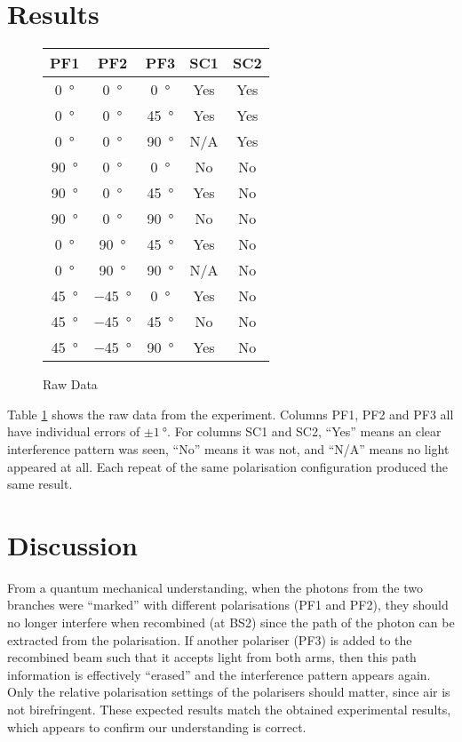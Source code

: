 \documentclass[a4paper]{scrartcl}
\begin{document}
\section{Results}
\begin{figure}
    \centering
    \begin{tabular}{c | c | c | c | c}
        PF1 & PF2 & PF3 & SC1 & SC2 \\
        \hline
        \SI{0}{\degree} & \SI{0}{\degree} & \SI{0}{\degree} & Yes & Yes \\
        \SI{0}{\degree} & \SI{0}{\degree} & \SI{45}{\degree} & Yes & Yes \\
        \SI{0}{\degree} & \SI{0}{\degree} & \SI{90}{\degree} & N/A & Yes \\
        \SI{90}{\degree} & \SI{0}{\degree} & \SI{0}{\degree} & No & No \\
        \SI{90}{\degree} & \SI{0}{\degree} & \SI{45}{\degree} & Yes & No \\
        \SI{90}{\degree} & \SI{0}{\degree} & \SI{90}{\degree} & No & No \\
        \SI{0}{\degree} & \SI{90}{\degree} & \SI{45}{\degree} & Yes & No \\
        \SI{0}{\degree} & \SI{90}{\degree} & \SI{90}{\degree} & N/A & No \\
        \SI{45}{\degree} & \SI{-45}{\degree} & \SI{0}{\degree} & Yes & No \\
        \SI{45}{\degree} & \SI{-45}{\degree} & \SI{45}{\degree} & No & No \\
        \SI{45}{\degree} & \SI{-45}{\degree} & \SI{90}{\degree} & Yes & No
    \end{tabular}
    \caption{Raw Data}
    \label{tab:raw-data}
\end{figure}

Table \ref{tab:raw-data} shows the raw data from the experiment. Columns PF1, PF2 and PF3 all have individual errors of \(\pm\SI{1}{\degree}\). For columns SC1 and SC2, ``Yes'' means an clear interference pattern was seen, ``No'' means it was not, and ``N/A'' means no light appeared at all. Each repeat of the same polarisation configuration produced the same result.

\section{Discussion}
From a quantum mechanical understanding, when the photons from the two branches were ``marked'' with different polarisations (PF1 and PF2), they should no longer interfere when recombined (at BS2) since the path of the photon can be extracted from the polarisation. If another polariser (PF3) is added to the recombined beam such that it accepts light from both arms, then this path information is effectively ``erased'' and the interference pattern appears again. Only the relative polarisation settings of the polarisers should matter, since air is not birefringent. These expected results match the obtained experimental results, which appears to confirm our understanding is correct.
\end{document}
